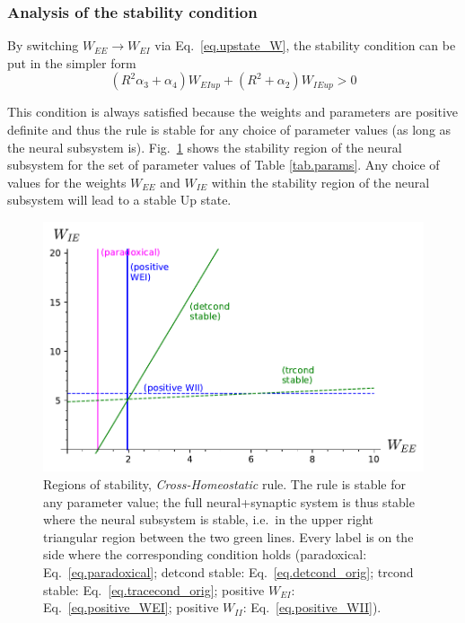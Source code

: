 \documentclass[
twocolumn,
]{article}
\newcommand{\EE}{\mathit{EE}}
\newcommand{\EI}{\mathit{EI}}
\newcommand{\IE}{\mathit{IE}}
\newcommand{\II}{\mathit{II}}
\newcommand{\up}{\mathit{up}}
\begin{document}
\subsubsection{Analysis of the stability condition}

By switching $W_{\EE} \rightarrow W_{\EI}$ via Eq.\ \ref{eq.upstate_W}, the stability condition can be put in the simpler form
\begin{equation}
(R^2 \alpha_3 + \alpha_4) W_{\EI\up} + (R^2 + \alpha_2) W_{\IE\up} > 0
\label{eq.CH_stable_cond_v2}
\end{equation}

\noindent This condition is always satisfied because the weights and parameters are positive definite and thus the rule is stable for any choice of parameter values (as long as the neural subsystem is). Fig.\ \ref{fig.CH_stability} shows the stability region of the neural subsystem for the set of parameter values of Table \ref{tab.params}. Any choice of values for the weights $W_{\EE}$ and $W_{\IE}$ within the stability region of the neural subsystem will lead to a stable Up state.



\begin{figure}[ht]
\centering
\includegraphics[width=\linewidth]{CH_stability}
\caption{Regions of stability, {\em Cross-Homeostatic} rule. The rule is stable for any parameter value; the full neural+synaptic system is thus stable where the neural subsystem is stable, i.e.\ in the upper right triangular region between the two green lines. Every label is on the side where the  corresponding  condition  holds (paradoxical: Eq.\ \ref{eq.paradoxical}; detcond stable: Eq.\ \ref{eq.detcond_orig}; trcond stable: Eq.\ \ref{eq.tracecond_orig}; positive $W_{\EI}$: Eq.\ \ref{eq.positive_WEI}; positive $W_{\II}$: Eq.\ \ref{eq.positive_WII}).}
\label{fig.CH_stability}
\end{figure}
\end{document}

